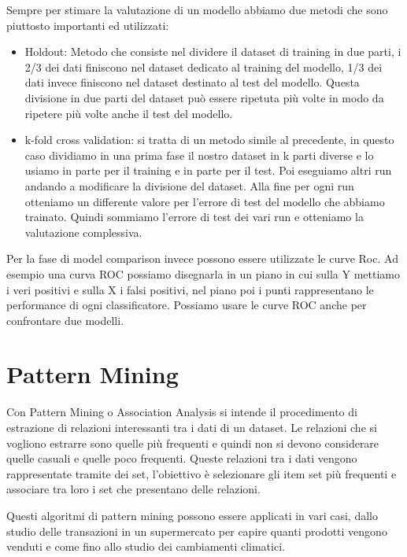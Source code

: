 \documentclass[14pt]{extreport}
\begin{document}
Sempre per stimare la valutazione di un modello abbiamo due metodi che sono piuttosto importanti ed utilizzati:

\begin{itemize}
    \item Holdout: Metodo che consiste nel dividere il dataset di training in due parti, i 2/3 dei dati finiscono nel dataset dedicato al training del modello, 1/3 dei dati invece finiscono nel dataset destinato al test del modello.
    Questa divisione in due parti del dataset può essere ripetuta più volte in modo da ripetere più volte anche il test del modello.
    \item k-fold cross validation: si tratta di un metodo simile al precedente, in questo caso dividiamo in una prima fase il nostro dataset in k parti diverse e lo usiamo in parte per il training e in parte per il test. Poi eseguiamo altri run andando a modificare la divisione del dataset. Alla fine per ogni run otteniamo un differente valore per l'errore di test del modello che abbiamo trainato. Quindi sommiamo l'errore di test dei vari run e otteniamo la valutazione complessiva.
\end{itemize}

\newline
Per la fase di model comparison invece possono essere utilizzate le curve Roc.
Ad esempio una curva ROC possiamo disegnarla in un piano in cui sulla Y mettiamo i veri positivi e sulla X i falsi positivi, nel piano poi i punti rappresentano le performance di ogni classificatore.
Possiamo usare le curve ROC anche per confrontare due modelli.

\newpage
\chapter{Pattern Mining}

Con Pattern Mining o Association Analysis si intende il procedimento di estrazione di relazioni interessanti tra i dati di un dataset.
Le relazioni che si vogliono estrarre sono quelle più frequenti e quindi non si devono considerare quelle casuali e quelle poco frequenti.
Queste relazioni tra i dati vengono rappresentate tramite dei set, l'obiettivo è selezionare gli item set più frequenti e associare tra loro i set che presentano delle relazioni.

Questi algoritmi di pattern mining possono essere applicati in vari casi, dallo studio delle transazioni in un supermercato per capire quanti prodotti vengono venduti e come fino allo studio dei cambiamenti climatici.
\end{document}
